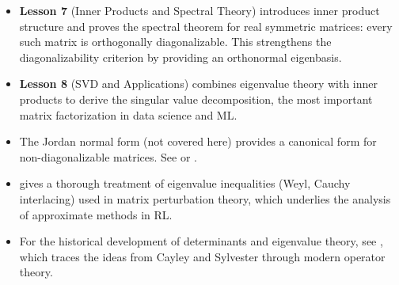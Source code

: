 \documentclass[11pt,a4paper]{article}
\begin{document}
\begin{itemize}
  \item \textbf{Lesson 7} (Inner Products and Spectral Theory) introduces
        inner product structure and proves the spectral theorem for real
        symmetric matrices: every such matrix is orthogonally
        diagonalizable.  This strengthens the diagonalizability criterion
        by providing an orthonormal eigenbasis.

  \item \textbf{Lesson 8} (SVD and Applications) combines eigenvalue theory
        with inner products to derive the singular value decomposition,
        the most important matrix factorization in data science and ML.

  \item The Jordan normal form (not covered here) provides a canonical
        form for non-diagonalizable matrices.  See \citet[Chapter~8]{hoffman1971}
        or \citet[Chapter~3]{horn2013}.

  \item \citet[Chapter~1]{horn2013} gives a thorough treatment of
        eigenvalue inequalities (Weyl, Cauchy interlacing) used in
        matrix perturbation theory, which underlies the analysis of
        approximate methods in RL.

  \item For the historical development of determinants and eigenvalue
        theory, see \citet{lax2007}, which traces the ideas from Cayley
        and Sylvester through modern operator theory.
\end{itemize}


\end{document}
